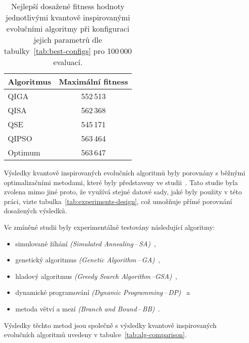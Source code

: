 \begin{table}[ht]
    \centering
    \begin{tabular}{l c}
        \toprule
        \textbf{Algoritmus} & \textbf{Maximální fitness} \\
        \midrule
        QIGA    & 552\,513 \\[1ex]
        QISA    & 562\,368 \\[1ex]
        QSE     & 545\,171 \\[1ex]
        QIPSO   & 563\,464 \\
        \midrule
        Optimum & 563\,647 \\
        \bottomrule
    \end{tabular}
    \caption{Nejlepší dosažené fitness hodnoty jednotlivými kvantově inspirovanými evolučními algoritmy při konfiguraci jejich parametrů dle tabulky~\ref{tab:best-configs} pro 100\,000 evaluací.}
    \label{tab:max-fitness-10000}
\end{table}

Výsledky kvantově inspirovaných evolučních algoritmů byly porovnány s běžnými optimalizačními metodami, které byly představeny ve studii~\cite{compare}.  
Tato studie byla zvolena mimo jiné proto, že využívá stejné datové sady, jaké byly použity v této práci, vizte tabulka~\ref{tab:experiments-design}, což umožňuje přímé porovnání dosažených výsledků.

Ve zmíněné studii byly experimentálně testovány následující algoritmy:
\begin{itemize}
    \item simulované žíhání \emph{(Simulated Annealing\,--\,SA)}~\cite{sa},
    \item genetický algoritmus \emph{(Genetic Algorithm\,--\,GA)}~\cite{ga-app},
    \item hladový algoritmus \emph{(Greedy Search Algorithm\,--GSA)}~\cite{GSA},
    \item dynamické programování \emph{(Dynamic Programming\,--\,DP)}~\cite{DP} a 
    \item metoda větví a mezí \emph{(Branch and Bound\,--\,BB)}~\cite{BB}.
\end{itemize}
Výsledky těchto metod jsou společně s výsledky kvantově inspirovaných evolučních algoritmů uvedeny v tabulce~\ref{tab:alg-comparison}.

